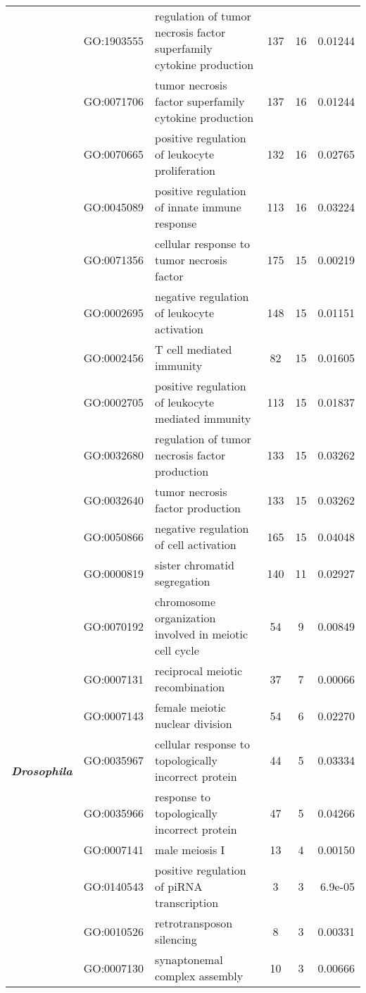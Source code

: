 \documentclass[../main.tex]{subfiles}
\begin{document}
\begin{landscape}
\begin{longtable}{@{}lllccr@{}}
     & GO:1903555 & regulation of tumor necrosis factor superfamily cytokine production & 137 & 16 & 0.01244 \\
     & GO:0071706 & tumor necrosis factor superfamily cytokine production & 137 & 16 & 0.01244 \\
     & GO:0070665 & positive regulation of leukocyte proliferation & 132 & 16 & 0.02765 \\
     & GO:0045089 & positive regulation of innate immune response & 113 & 16 & 0.03224 \\
     & GO:0071356 & cellular response to tumor necrosis factor & 175 & 15 & 0.00219 \\
     & GO:0002695 & negative regulation of leukocyte activation & 148 & 15 & 0.01151 \\
     & GO:0002456 & T cell mediated immunity & 82 & 15 & 0.01605 \\
     & GO:0002705 & positive regulation of leukocyte mediated immunity & 113 & 15 & 0.01837 \\
     & GO:0032680 & regulation of tumor necrosis factor production & 133 & 15 & 0.03262 \\
     & GO:0032640 & tumor necrosis factor production & 133 & 15 & 0.03262 \\
     & GO:0050866 & negative regulation of cell activation & 165 & 15 & 0.04048 \\* \midrule
    \multirow{10}{*}{\textit{\textbf{Drosophila}}} & GO:0000819 & sister chromatid segregation & 140 & 11 & 0.02927 \\
     & GO:0070192 & chromosome organization involved in meiotic cell cycle & 54 & 9 & 0.00849 \\
     & GO:0007131 & reciprocal meiotic recombination & 37 & 7 & 0.00066 \\
     & GO:0007143 & female meiotic nuclear division & 54 & 6 & 0.02270 \\
     & GO:0035967 & cellular response to topologically incorrect protein & 44 & 5 & 0.03334 \\
     & GO:0035966 & response to topologically incorrect protein & 47 & 5 & 0.04266 \\
     & GO:0007141 & male meiosis I & 13 & 4 & 0.00150 \\
     & GO:0140543 & positive regulation of piRNA transcription & 3 & 3 & 6.9e-05 \\
     & GO:0010526 & retrotransposon silencing & 8 & 3 & 0.00331 \\
     & GO:0007130 & synaptonemal complex assembly & 10 & 3 & 0.00666 \\

\end{longtable}
\end{landscape}
\end{document}
